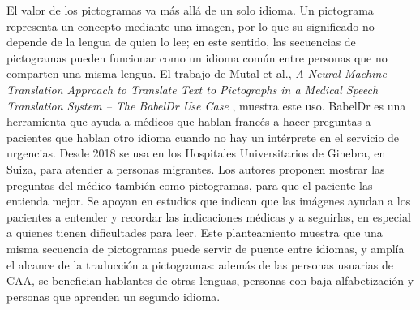 El valor de los pictogramas va más allá de un solo idioma. Un pictograma representa un concepto mediante una imagen, por lo que su significado no depende de la lengua de quien lo lee; en este sentido, las secuencias de pictogramas pueden funcionar como un idioma común entre personas que no comparten una misma lengua. El trabajo de Mutal et al., \textit{A Neural Machine Translation Approach to Translate Text to Pictographs in a Medical Speech Translation System -- The BabelDr Use Case} \cite{mutal2022}, muestra este uso. BabelDr es una herramienta que ayuda a médicos que hablan francés a hacer preguntas a pacientes que hablan otro idioma cuando no hay un intérprete en el servicio de urgencias. Desde 2018 se usa en los Hospitales Universitarios de Ginebra, en Suiza, para atender a personas migrantes. Los autores proponen mostrar las preguntas del médico también como pictogramas, para que el paciente las entienda mejor. Se apoyan en estudios que indican que las imágenes ayudan a los pacientes a entender y recordar las indicaciones médicas y a seguirlas, en especial a quienes tienen dificultades para leer. Este planteamiento muestra que una misma secuencia de pictogramas puede servir de puente entre idiomas, y amplía el alcance de la traducción a pictogramas: además de las personas usuarias de CAA, se benefician hablantes de otras lenguas, personas con baja alfabetización y personas que aprenden un segundo idioma.

